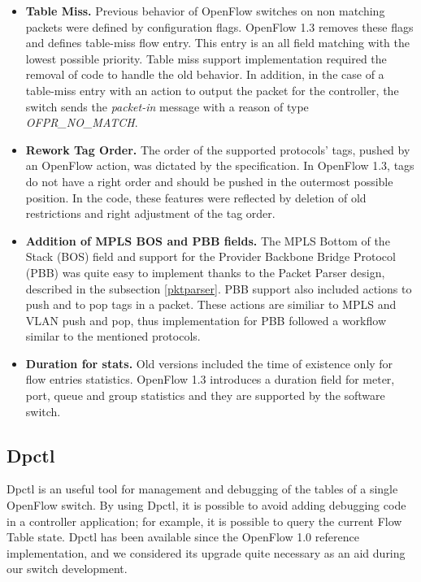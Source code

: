 \begin{itemize}
\item \textbf{Table Miss.} Previous behavior of OpenFlow switches on non matching packets were defined by configuration flags. OpenFlow 1.3 removes these flags and defines table-miss flow entry. This entry is an all field matching with the lowest possible priority. Table miss support implementation required the removal of code to handle the old behavior. In addition, in the case of a table-miss entry with an action to output the packet for the controller, the switch sends the \textit{packet-in} message with a reason of type \textit{OFPR_NO_MATCH}.      

\item \textbf{Rework Tag Order.} The order of the supported protocols' tags, pushed by an OpenFlow action, was dictated by the specification. In OpenFlow 1.3, tags do not have a right order and should be pushed in the outermost possible position. In the code, these features were reflected by deletion of old restrictions and right adjustment of the tag order. 

\item \textbf{Addition of MPLS BOS and PBB fields.} The MPLS Bottom of the Stack (BOS) field and support for the Provider Backbone Bridge Protocol (PBB) was quite easy to implement thanks to the Packet Parser design, described in the subsection \ref{pktparser}. PBB support also included actions to push and to pop tags in a packet. These actions are similiar to MPLS and VLAN push and pop, thus implementation for PBB followed a workflow similar to the mentioned protocols.  

\item \textbf{Duration for stats.} Old versions included the time of existence  only for flow entries statistics. OpenFlow 1.3 introduces a duration field for meter, port, queue and group statistics and they are supported by the software switch.  

\end{itemize}

\subsection{Dpctl}
\label{sec:sec47}

Dpctl is an useful tool for management and debugging of the tables of a single OpenFlow switch. By using Dpctl, it is possible to avoid adding debugging code in a controller application; for example, it is possible to query the current Flow Table state. Dpctl has been available since the OpenFlow 1.0 reference implementation, and we considered its upgrade quite necessary as an aid during our switch development. 

